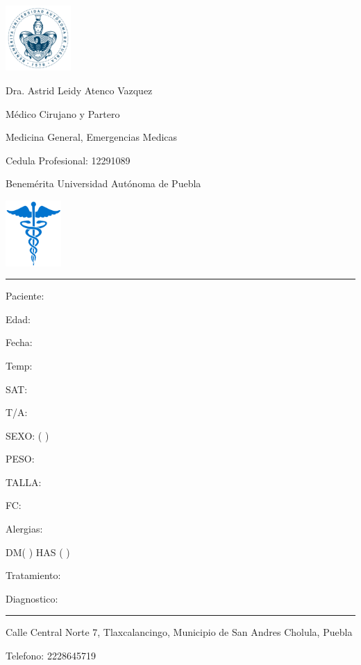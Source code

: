 \documentclass[landscape]{article}
\begin{document}
\setlength{\parindent}{0pt}

\includegraphics[height=2.5cm,keepaspectratio]{buapLogo.png}
\hfill
\begin{minipage}[b]{0.5\linewidth}
\begin{center}
\small
Dra. Astrid Leidy Atenco Vazquez

Médico Cirujano y Partero

Medicina General, Emergencias Medicas

Cedula Profesional: 12291089

Benemérita Universidad Autónoma de Puebla
\end{center}
\end{minipage}
\hfill
\includegraphics[height=2.5cm,keepaspectratio]{medicalLogo.png}
\vspace{1em}
\hrule
\vspace{1em}
\begin{minipage}[t]{0.88\linewidth}
\scriptsize
Paciente:

Edad:

Fecha:
\vfill
\end{minipage}
\begin{minipage}[t]{0.1\linewidth}
\scriptsize
Temp:

SAT:

T/A:

SEXO: ( )

PESO:

TALLA:

FC:

Alergias:

DM( ) HAS ( )
\end{minipage}
\scriptsize

Tratamiento:

\begin{itemize}
\end{itemize}

\vfill

Diagnostico:

\vspace{1em}

\hrule
\begin{center}
\scriptsize
Calle Central Norte 7, Tlaxcalancingo, Municipio de San Andres Cholula, Puebla

Telefono: 2228645719
\end{center}
\end{document}
